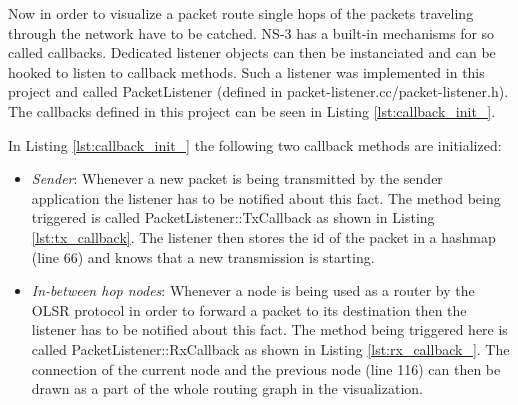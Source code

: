 Now in order to visualize a packet route single hops of the packets
traveling through the network have to be catched. NS-3 has a built-in
mechanisms for so called callbacks. Dedicated listener objects can
then be instanciated and can be hooked to listen to callback methods.
Such a listener was implemented in this project and called PacketListener
(defined in packet-listener.cc/packet-listener.h). The callbacks defined
in this project can be seen in Listing \ref{lst:callback_init_}.

\texttt{\small }{\small \par}

In Listing \ref{lst:callback_init_} the following two callback methods
are initialized:
\begin{itemize}
\item \textit{Sender}: Whenever a new packet is being transmitted by the
sender application the listener has to be notified about this fact.
The method being triggered is called PacketListener::TxCallback as
shown in Listing \ref{lst:tx_callback}. The listener then stores
the id of the packet in a hashmap (line 66) and knows that a new transmission
is starting.
\item \textit{In-between hop nodes}: Whenever a node is being used as a
router by the OLSR protocol in order to forward a packet to its destination
then the listener has to be notified about this fact. The method being
triggered here is called PacketListener::RxCallback as shown in Listing
\ref{lst:rx_callback_}. The connection of the current node and the
previous node (line 116) can then be drawn as a part of the whole
routing graph in the visualization.
\end{itemize}
\texttt{\small }{\small \par}

\texttt{\small }{\small \par}

